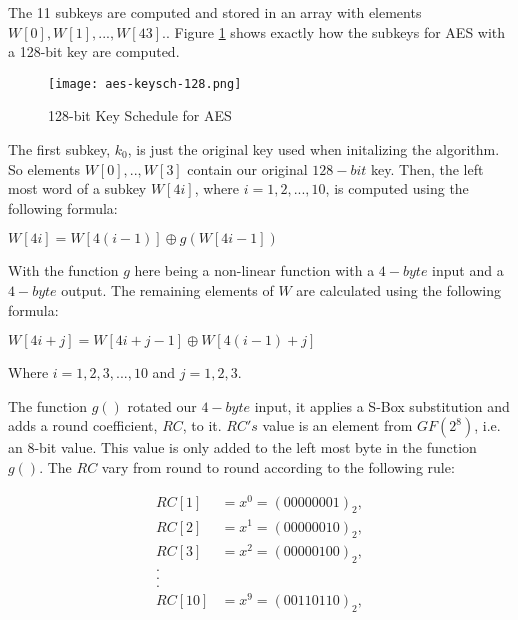 The 11 subkeys are computed and stored in an array with elements $W[0], W[1], ..., W[43].$. Figure \ref{AES-KeySch-128} shows exactly how the subkeys for AES with a 128-bit key are computed. 

\begin{figure}[H]
\begin{center}
\texttt{[image: aes-keysch-128.png]}
\end{center}
\caption{128-bit Key Schedule for AES}
\label{AES-KeySch-128}
\end{figure}

The first subkey, $k_0$, is just the original key used when initalizing the algorithm. So elements $W[0], .., W[3]$ contain our original $128-bit$ key. Then, the left most word of a subkey $W[4i]$, where $i = 1,2,...,10$, is computed using the following formula:

\begin{center}
$W[4i] = W[4(i - 1)] \oplus g(W[4i - 1])$
\end{center}

With the function $g$ here being a non-linear function with a $4-byte$ input and a $4-byte$ output. The remaining elements of $W$ are calculated using the following formula:

\begin{center}
$W[4i + j] = W[4i + j - 1] \oplus W[4(i - 1) + j]$

Where $i = 1,2,3,...,10$ and $j = 1,2,3$. 
\end{center}

The function $g()$ rotated our $4-byte$ input, it applies a S-Box substitution and adds a round coefficient, $RC$, to it. $RC's$ value is an element from $GF(2^8)$, i.e. an 8-bit value. This value is only added to the left most byte in the function $g()$. The $RC$ vary from round to round according to the following rule:

\begin{center}
\begin{align*}
RC[1] &= x^0 = (0000 0001)_2, \\
RC[2] &= x^1 = (0000 0010)_2, \\
RC[3] &= x^2 = (0000 0100)_2, \\
. \\
. \\
. \\
RC[10] &= x^9 = (0011 0110)_2,  
\end{align*}
\end{center}  


